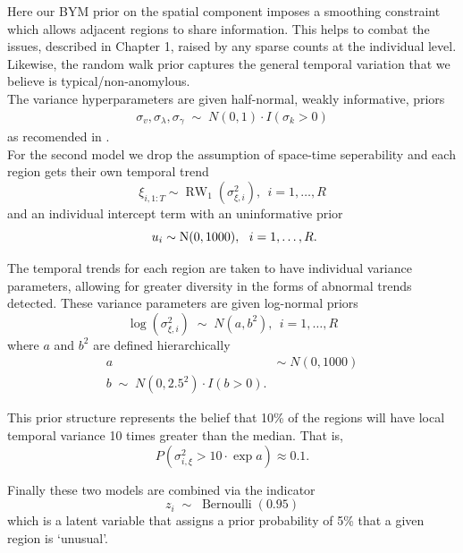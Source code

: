 \documentclass[11pt]{report}
\begin{document}
Here our BYM prior on the spatial component imposes a smoothing constraint which allows adjacent regions to share information. This helps to combat the issues, described in Chapter 1, raised by any sparse counts at the individual level. Likewise, the random walk prior captures the general temporal variation that we believe is typical/non-anomylous. \\

The variance hyperparameters are given half-normal, weakly informative, priors
\begin{gather}
\sigma_v, \sigma_\lambda, \sigma_\gamma \; \sim \; N(0, 1) \cdot I(\sigma_k > 0)
\end{gather}
as recomended in \citet{gelman2006prior}. \\

For the second model we drop the assumption of space-time seperability and each region gets their own temporal trend
\begin{equation*}
\xi_{i, 1:T} \sim \operatorname{RW}_1(\sigma_{\xi, i}^2), \ \ i=1,\ldots, R 
\end{equation*}
and an individual intercept term with an uninformative prior
\begin{equation*}
\ u_i \sim \operatorname{N}(0, 1000), \ \  i=1,\ldots, R. \\
\end{equation*}

The temporal trends for each region are taken to have individual variance parameters, allowing for greater diversity in the forms of abnormal trends detected. These variance parameters are given log-normal priors
\begin{equation*}
\log(\sigma_{\xi, i}^2) \; \sim \; N(a, b^2), \ \ i=1,\ldots,R
\end{equation*}
where $a$ and $b^2$ are defined hierarchically
\begin{align*}
a \; &\sim \; N(0, 1000) \\
b \; \sim \; N(0, 2.5^2) \cdot I(b > 0).
\end{align*}

This prior structure represents the belief that 10\% of the regions will have local temporal variance 10 times greater than the median. That is,
\begin{equation*}
P(\sigma_{i, \xi}^2 > 10\cdot\exp{a}) \approx 0.1.
\end{equation*} 

Finally these two models are combined via the indicator
\begin{equation}
z_i \; \sim \; \operatorname{Bernoulli}(0.95)
\end{equation}
which is a latent variable that assigns a prior probability of 5\% that a given region is `unusual'. \\
\end{document}
